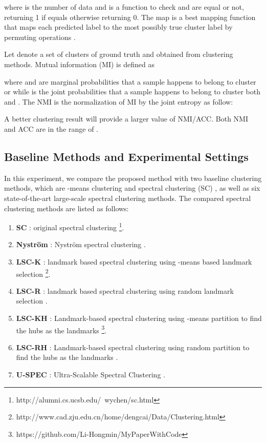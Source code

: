 where  is the number of data  and  is a function to check  and  are equal or not,  returning 1 if equals otherwise returning 0. The map is a best mapping function that maps each predicted label to the most possibly true cluster label by permuting operations \cite{xu2003document}.

Let  denote a set of clusters of ground truth and  obtained from clustering methods. Mutual information (MI) is defined as

where  and  are marginal probabilities that a sample happens to belong to cluster  or  while  is the joint probabilities that a sample happens to belong to cluster both  and .
The NMI is the normalization of MI by the joint entropy as follow:


A better clustering result will provide a larger value of NMI/ACC. Both NMI and ACC are in the range of .


\subsection{Baseline Methods and Experimental Settings}

In this experiment, we compare the proposed method with two baseline clustering methods, which are -means clustering and spectral clustering (SC) \cite{chen2010parallel}, as well as six state-of-the-art large-scale spectral clustering methods. The compared spectral clustering methods are listed as follows:

\begin{enumerate}
  \item \textbf{SC} \cite{chen2010parallel}: original spectral clustering \footnote{\label{psc}http://alumni.cs.ucsb.edu/~wychen/sc.html}.
  \item \textbf{Nystr\"{o}m} \cite{fowlkes2004spectral}: Nystr\"{o}m spectral clustering .
  \item \textbf{LSC-K} \cite{cai2014large}: landmark based spectral clustering using -means based landmark selection \footnote{\label{LSC}http://www.cad.zju.edu.cn/home/dengcai/Data/Clustering.html}.
  \item \textbf{LSC-R} \cite{cai2014large}: landmark based spectral clustering using random landmark selection .
  \item \textbf{LSC-KH} \cite{ye2018large}: Landmark-based spectral clustering using -means partition to find the hubs as the landmarks \footnote{\label{mycode}https://github.com/Li-Hongmin/MyPaperWithCode}.
  \item \textbf{LSC-RH} \cite{ye2018large}: Landmark-based spectral clustering using random partition to find the hubs as the landmarks .
  \item \textbf{U-SPEC} \cite{huang2019ultra}: Ultra-Scalable Spectral Clustering .
\end{enumerate}

